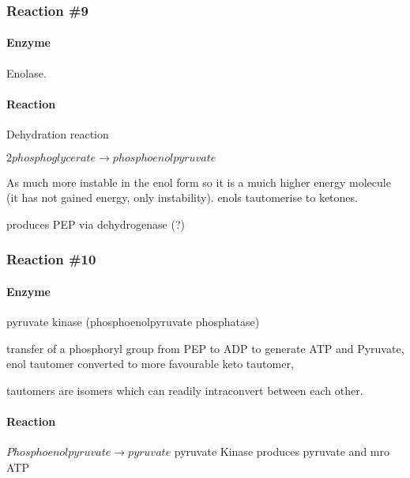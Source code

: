\documentclass[]{article}
\let\oldparagraph\paragraph
\renewcommand{\paragraph}[1]{\oldparagraph{#1}\mbox{}}
\begin{document}
\hypertarget{reaction-9}{%
\subsubsection{Reaction \#9}\label{reaction-9}}

\hypertarget{enzyme-3}{%
\paragraph{Enzyme}\label{enzyme-3}}

Enolase.

\hypertarget{reaction-4}{%
\paragraph{Reaction}\label{reaction-4}}

Dehydration reaction

\(2 phosphoglycerate \rightarrow phosphoenolpyruvate\)

As much more instable in the enol form so it is a muich higher energy
molecule (it has not gained energy, only instability). enols tautomerise
to ketones.

produces PEP via dehydrogenase (?)

\hypertarget{reaction-10}{%
\subsubsection{Reaction \#10}\label{reaction-10}}

\hypertarget{enzyme-4}{%
\paragraph{Enzyme}\label{enzyme-4}}

pyruvate kinase (phosphoenolpyruvate phosphatase)

transfer of a phosphoryl group from PEP to ADP to generate ATP and
Pyruvate, enol tautomer converted to more favourable keto tautomer,

tautomers are isomers which can readily intraconvert between each other.

\hypertarget{reaction-7}{%
\paragraph{Reaction}\label{reaction-7}}

\(Phosphoenolpyruvate \rightarrow pyruvate\) pyruvate Kinase produces
pyruvate and mro ATP
\end{document}
